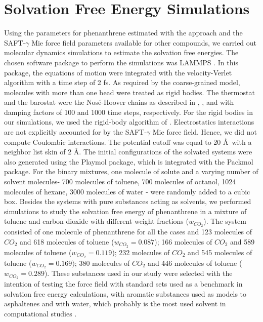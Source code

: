 \documentclass[
	12pt,				%
	openany,			%
	oneside,			%
	a4paper,			%
	english,			%
	brazil				%
	]{abntex2}
\providecommand{\DIFadd}[1]{{\protect\color{blue}\uwave{#1}}}
\providecommand{\DIFaddbegin}{}
\providecommand{\DIFaddend}{}
\providecommand{\DIFadd}[1]{{\protect\color{blue}\uwave{#1}}} %
\providecommand{\DIFaddbegin}{} %
\providecommand{\DIFaddend}{} %
\begin{document}
\section{Solvation Free Energy Simulations}\label{solvme}

Using the parameters for phenanthrene estimated with the  approach and the SAFT-$\gamma$ Mie force field parameters available for other compounds, we carried out molecular dynamics simulations to estimate the solvation free energies. The chosen software package to perform the simulations was LAMMPS  \cite{lammps}. In this package, the equations of motion were integrated with the velocity-Verlet algorithm \cite{verlet} with a time step of 2 fs. As required by the coarse-grained model,  molecules with more than one bead were treated as rigid bodies. The thermostat and the barostat were the Nos\'{e}-Hoover chains as described in , , and  with damping factors of 100 and 1000 time steps, respectively. For the rigid bodies in our simulations, we used the rigid-body algorithm of . Electrostatics interactions are not explicitly accounted for by the SAFT-$\gamma$ Mie force field. Hence, we did not compute Coulombic interactions. The potential cutoff was equal to 20 \AA $\,$ \cite{muller2017} with a neighbor list skin of 2 \AA. The initial configurations of the solvated systems were also generated using the Playmol package, which is integrated with the Packmol package. For the binary mixtures, one molecule of solute and a varying number of solvent molecules- 700 molecules of toluene, 700 molecules of octanol, 1024 molecules of hexane, 3000 molecules of water - were randomly added to a cubic box. Besides the systems with pure substances acting as solvents, we performed simulations to study the solvation free energy of phenanthrene in a mixture of toluene and carbon dioxide with different weight fractions ($w_{CO_{2}}$). The  system consisted of one molecule of phenanthrene for all the cases and 123 molecules of $CO_{2}$ and 618 molecules of toluene ($w_{CO_{2}} = 0.087$); 166 molecules of $CO_{2}$ and 589 molecules of toluene ($w_{CO_{2}} = 0.119$); 232 molecules of $CO_{2}$ and 545 molecules of toluene ($w_{CO_{2}} = 0.169)$; 380 molecules of $CO_{2}$ and 446 molecules of toluene ($w_{CO_{2}} = 0.289$). These substances used in our study were selected with the intention of testing the force field with standard sets used as a benchmark in solvation free energy calculations, with aromatic substances used as models to asphaltenes and with water, which probably is the most used solvent in computational studies \DIFaddbegin \DIFadd{of solvation free energies}\DIFaddend .
\end{document}
